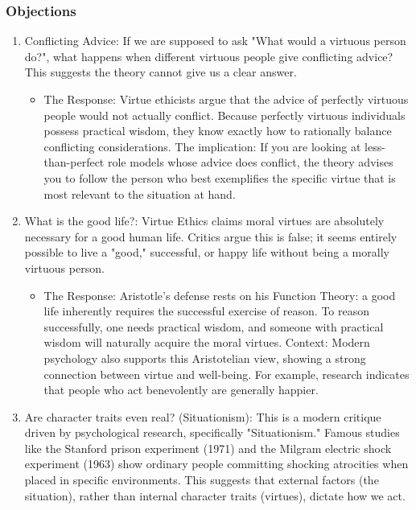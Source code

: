 \documentclass[12pt]{article}
\begin{document}
\subsubsection{Objections}
\begin{enumerate}
    \item Conflicting Advice: If we are supposed to ask "What would a virtuous person do?", what happens when different virtuous people give conflicting advice? This suggests the theory cannot give us a clear answer.
    \begin{itemize}
        \item The Response: Virtue ethicists argue that the advice of perfectly virtuous people would not actually conflict. Because perfectly virtuous individuals possess practical wisdom, they know exactly how to rationally balance conflicting considerations.\newline
        The implication: If you are looking at less-than-perfect role models whose advice does conflict, the theory advises you to follow the person who best exemplifies the specific virtue that is most relevant to the situation at hand.
    \end{itemize}
    \item What is the good life?: Virtue Ethics claims moral virtues are absolutely necessary for a good human life. Critics argue this is false; it seems entirely possible to live a "good," successful, or happy life without being a morally virtuous person.
    \begin{itemize}
        \item The Response: Aristotle's defense rests on his Function Theory: a good life inherently requires the successful exercise of reason. To reason successfully, one needs practical wisdom, and someone with practical wisdom will naturally acquire the moral virtues.\newline
        Context: Modern psychology also supports this Aristotelian view, showing a strong connection between virtue and well-being. For example, research indicates that people who act benevolently are generally happier.
    \end{itemize}
    \item Are character traits even real? (Situationism): This is a modern critique driven by psychological research, specifically "Situationism." Famous studies like the Stanford prison experiment (1971) and the Milgram electric shock experiment (1963) show ordinary people committing shocking atrocities when placed in specific environments.
    This suggests that external factors (the situation), rather than internal character traits (virtues), dictate how we act.\newline

\end{enumerate}
\end{document}
